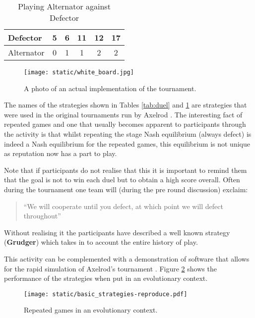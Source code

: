 \documentclass[12pt, a4paper]{article}
\begin{document}
\begin{table}[!htbp]
    \caption{Playing Alternator against Defector}
    \centering
    \begin{tabular}{lccccc}
        \toprule
        Defector&5&6&11&12&17\\
        \midrule
        Alternator&0&1&1&2&2\\
        \bottomrule
    \end{tabular}
    \label{tab:duel_1}
\end{table}

\begin{figure}[!hbtp]
    \centering
    \texttt{[image: static/white\_board.jpg]}
    \caption{A photo of an actual implementation of the tournament.}
    \label{fig:white_board}
\end{figure}

The names of the strategies shown in Tables \ref{tab:duel} and \ref{tab:duel_1}
are strategies that were used in the original tournaments run by Axelrod
\cite{Axelrod1980a, Axelrod1980b}. The interesting fact of repeated games and
one that usually becomes apparent to participants through the activity is that
whilst repeating the stage Nash equilibrium (always defect) is indeed a Nash
equilibrium for the repeated games, this equilibrium is not unique as reputation
now has a part to play.

Note that if participants do not realise that this it is important to remind
them that the goal is not to win each duel but to obtain a high score overall.
Often during the tournament one team will (during the pre round discussion)
exclaim:

\begin{quote}
   ``We will cooperate until you defect, at which point we will defect
throughout''
\end{quote}

Without realising it the participants have described a well known strategy
(\textbf{Grudger}) which takes in to account the entire history of play.

This activity can be complemented with a demonstration of software that allows
for the rapid simulation of Axelrod's tournament
\cite{Axelrod-Pythonprojectteam2015}. Figure \ref{fig:evolutionary_axelrod}
shows the performance of the strategies when put in an evolutionary context.

\begin{figure}[!hbtp]
    \centering
    \texttt{[image: static/basic\_strategies-reproduce.pdf]}
    \caption{Repeated games in an evolutionary context.}
    \label{fig:evolutionary_axelrod}
\end{figure}
\end{document}
